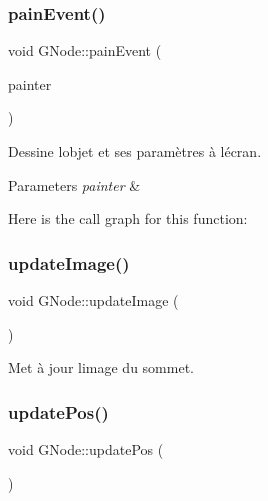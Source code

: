 \subsubsection{\texorpdfstring{pain\+Event()}{painEvent()}}
{\footnotesize\ttfamily void G\+Node\+::pain\+Event (\begin{DoxyParamCaption}\item[{Q\+Painter \&}]{painter }\end{DoxyParamCaption})\hspace{0.3cm}{\ttfamily [inline]}}



Dessine l\textquotesingle{}objet et ses paramètres à l\textquotesingle{}écran. 


\begin{DoxyParams}{Parameters}
{\em painter} & \\
\hline
\end{DoxyParams}
Here is the call graph for this function\+:
\mbox{\label{struct_g_node_a131f3025a4d61433e58b5d7dbe702820}} 
\subsubsection{\texorpdfstring{update\+Image()}{updateImage()}}
{\footnotesize\ttfamily void G\+Node\+::update\+Image (\begin{DoxyParamCaption}{ }\end{DoxyParamCaption})\hspace{0.3cm}{\ttfamily [inline]}}



Met à jour l\textquotesingle{}image du sommet. 

\mbox{\label{struct_g_node_a3c38a45a7b98a63d3f240d8e62032fb8}} 
\subsubsection{\texorpdfstring{update\+Pos()}{updatePos()}}
{\footnotesize\ttfamily void G\+Node\+::update\+Pos (\begin{DoxyParamCaption}{ }\end{DoxyParamCaption})\hspace{0.3cm}{\ttfamily [inline]}}



